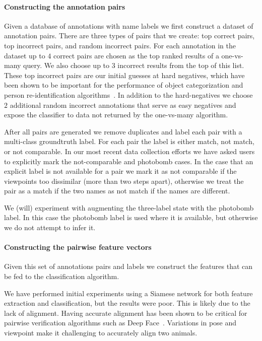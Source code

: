 \paragraph{Constructing the annotation pairs}
Given a database of annotations with name labels we first construct a dataset
  of annotation pairs.
There are three types of pairs that we create:
top correct pairs, top incorrect pairs, and random incorrect pairs.
For each annotation in the dataset up to $4$ correct pairs are chosen as the
  top ranked results of a one-vs-many query.
We also choose up to $3$ incorrect results from the top of this list.
These top incorrect pairs are our initial guesses at hard negatives, which
  have been shown to be important for the performance of object categorization
  and person re-identification algorithms~\cite{shi_embedding_2016,
  felzenszwalb_object_2010}.
In addition to the hard-negatives we choose $2$ additional random incorrect
  annotations that serve as easy negatives and expose the classifier to data not
  returned by the one-vs-many algorithm.

After all pairs are generated we remove duplicates and label each pair with a
  multi-class groundtruth label.
For each pair the label is either match, not match, or not comparable.
In our most recent data collection efforts we have asked users to explicitly
  mark the not-comparable and photobomb cases.
In the case that an explicit label is not available for a pair we mark it as
  not comparable if the viewpoints too dissimilar (more than two steps apart),
  otherwise we treat the pair as a match if the two names as not match if the
  names are different.

We (will) experiment with augmenting the three-label state with the photobomb
  label.
In this case the photobomb label is used where it is available, but otherwise
  we do not attempt to infer it.


\paragraph{Constructing the pairwise feature vectors}

Given this set of annotations pairs and labels we construct the features that
  can be fed to the classification algorithm.

We have performed initial experiments using a Siamese network for both feature
  extraction and classification, but the results were poor.
This is likely due to the lack of alignment.
Having accurate alignment has been shown to be critical for pairwise
  verification algorithms such as Deep Face~\cite{taigman_deepface_2014}.
Variations in pose and viewpoint make it challenging to accurately align two
  animals.

